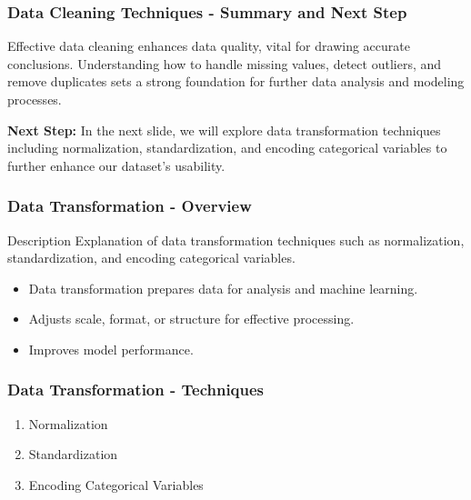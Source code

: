 \documentclass{beamer}
\begin{document}
\begin{frame}[fragile]
    \frametitle{Data Cleaning Techniques - Summary and Next Step}
    Effective data cleaning enhances data quality, vital for drawing accurate conclusions. Understanding how to handle missing values, detect outliers, and remove duplicates sets a strong foundation for further data analysis and modeling processes.
    
    \textbf{Next Step:} 
    In the next slide, we will explore data transformation techniques including normalization, standardization, and encoding categorical variables to further enhance our dataset's usability.
\end{frame}

\begin{frame}[fragile]
    \frametitle{Data Transformation - Overview}
    \begin{block}{Description}
        Explanation of data transformation techniques such as normalization, standardization, and encoding categorical variables.
    \end{block}
    
    \begin{itemize}
        \item Data transformation prepares data for analysis and machine learning.
        \item Adjusts scale, format, or structure for effective processing.
        \item Improves model performance.
    \end{itemize}
\end{frame}

\begin{frame}[fragile]
    \frametitle{Data Transformation - Techniques}
    \begin{enumerate}
        \item Normalization
        \item Standardization
        \item Encoding Categorical Variables
    \end{enumerate}
\end{frame}
\end{document}
